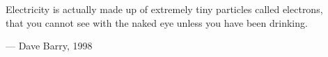 \begin{flushright}
\begin{hangleftquote}{\QENOpen}{\QENClose}
Electricity is actually made up of extremely tiny particles called electrons,\\
that you cannot see with the naked eye unless you have been drinking.
\end{hangleftquote}
\par\smallskip
\normalfont — Dave Barry, 1998
\end{flushright}
